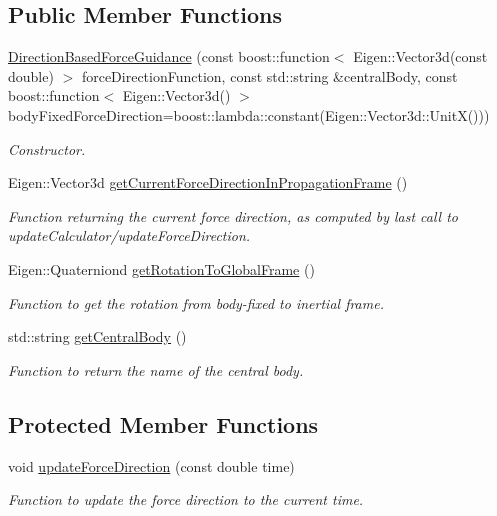 \subsection*{Public Member Functions}
\begin{DoxyCompactItemize}
\item 
\hyperlink{classtudat_1_1propulsion_1_1DirectionBasedForceGuidance_a544f02b698d184353f11c2d9c7d9f98b}{Direction\+Based\+Force\+Guidance} (const boost\+::function$<$ Eigen\+::\+Vector3d(const double) $>$ force\+Direction\+Function, const std\+::string \&central\+Body, const boost\+::function$<$ Eigen\+::\+Vector3d() $>$ body\+Fixed\+Force\+Direction=boost\+::lambda\+::constant(Eigen\+::\+Vector3d\+::\+UnitX()))
\begin{DoxyCompactList}\small\item\em Constructor. \end{DoxyCompactList}\item 
Eigen\+::\+Vector3d \hyperlink{classtudat_1_1propulsion_1_1DirectionBasedForceGuidance_a38bb2a2a0f9dbe4779f2c41572a4fc58}{get\+Current\+Force\+Direction\+In\+Propagation\+Frame} ()
\begin{DoxyCompactList}\small\item\em Function returning the current force direction, as computed by last call to update\+Calculator/update\+Force\+Direction. \end{DoxyCompactList}\item 
Eigen\+::\+Quaterniond \hyperlink{classtudat_1_1propulsion_1_1DirectionBasedForceGuidance_aa3cdb1ff8b634719189a630c58c34ffa}{get\+Rotation\+To\+Global\+Frame} ()
\begin{DoxyCompactList}\small\item\em Function to get the rotation from body-\/fixed to inertial frame. \end{DoxyCompactList}\item 
std\+::string \hyperlink{classtudat_1_1propulsion_1_1DirectionBasedForceGuidance_aaabe4c8b7e3acd6a5bd8a9d235fcef5b}{get\+Central\+Body} ()
\begin{DoxyCompactList}\small\item\em Function to return the name of the central body. \end{DoxyCompactList}\end{DoxyCompactItemize}
\subsection*{Protected Member Functions}
\begin{DoxyCompactItemize}
\item 
void \hyperlink{classtudat_1_1propulsion_1_1DirectionBasedForceGuidance_a4051907f746166d8d7fc9814b3e82192}{update\+Force\+Direction} (const double time)
\begin{DoxyCompactList}\small\item\em Function to update the force direction to the current time. \end{DoxyCompactList}\end{DoxyCompactItemize}
